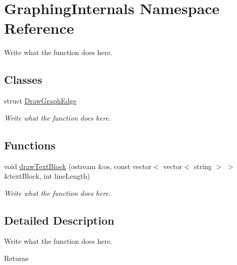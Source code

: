 \hypertarget{namespaceGraphingInternals}{\section{Graphing\+Internals Namespace Reference}
\label{namespaceGraphingInternals}
}


Write what the function does here.  


\subsection*{Classes}
\begin{DoxyCompactItemize}
\item 
struct \hyperlink{structGraphingInternals_1_1DrawGraphEdge}{Draw\+Graph\+Edge}
\begin{DoxyCompactList}\small\item\em Write what the function does here. \end{DoxyCompactList}\end{DoxyCompactItemize}
\subsection*{Functions}
\begin{DoxyCompactItemize}
\item 
void \hyperlink{namespaceGraphingInternals_ad65278d3b477dc96eb0b2b4242e49a3d}{draw\+Text\+Block} (ostream \&os, const vector$<$ vector$<$ string $>$ $>$ \&text\+Block, int line\+Length)
\begin{DoxyCompactList}\small\item\em Write what the function does here. \end{DoxyCompactList}\end{DoxyCompactItemize}


\subsection{Detailed Description}
Write what the function does here. 

\begin{DoxyReturn}{Returns}

\end{DoxyReturn}


